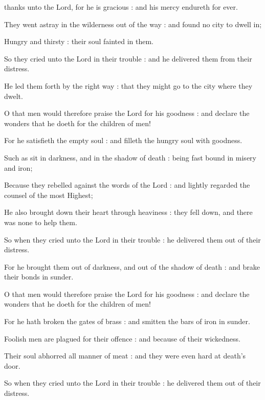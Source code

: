  thanks unto the Lord, for he is gracious : and his mercy endureth for ever.\par
{}
They went astray in the wilderness out of the way : and found no city to dwell in;\par
{}Hungry and thirsty : their soul fainted in them.\par
{}So they cried unto the Lord in their trouble : and he delivered them from their distress.\par
{}He led them forth by the right way : that they might go to the city where they dwelt.\par
{}O that men would therefore praise the Lord for his goodness : and declare the wonders that he doeth for the children of men!\par
{}For he satisfieth the empty soul : and filleth the hungry soul with goodness.\par
{}Such as sit in darkness, and in the shadow of death : being fast bound in misery and iron;\par
{}Because they rebelled against the words of the Lord : and lightly regarded the counsel of the most Highest;\par
{}He also brought down their heart through heaviness : they fell down, and there was none to help them.\par
{}So when they cried unto the Lord in their trouble : he delivered them out of their distress.\par
{}For he brought them out of darkness, and out of the shadow of death : and brake their bonds in sunder.\par
{}O that men would therefore praise the Lord for his goodness : and declare the wonders that he doeth for the children of men!\par
{}For he hath broken the gates of brass : and smitten the bars of iron in sunder.\par
{}Foolish men are plagued for their offence : and because of their wickedness.\par
{}Their soul abhorred all manner of meat : and they were even hard at death's door.\par
{}So when they cried unto the Lord in their trouble : he delivered them out of their distress.\par
